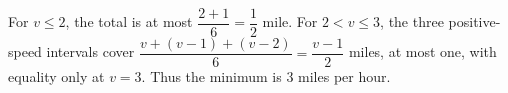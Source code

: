 For $v\le2$, the total is at most $\dfrac{2+1}{6}=\dfrac{1}{2}$ mile. For $2<v\le3$, the three positive-speed intervals cover $\dfrac{v+(v-1)+(v-2)}{6}=\dfrac{v-1}{2}$ miles, at most one, with equality only at $v=3$. Thus the minimum is $\boxed3$ miles per hour.
